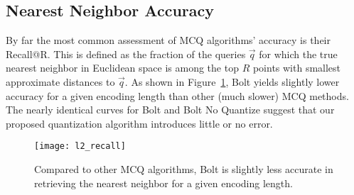 \subsection{Nearest Neighbor Accuracy}

By far the most common assessment of MCQ algorithms' accuracy is their Recall@R. This is defined as the fraction of the queries $\vec{q}$ for which the true nearest neighbor in Euclidean space is among the top $R$ points with smallest approximate distances to $\vec{q}$. As shown in Figure~\ref{fig:nn_acc}, Bolt yields slightly lower accuracy for a given encoding length than other (much slower) MCQ methods. The nearly identical curves for Bolt and Bolt No Quantize suggest that our proposed quantization algorithm introduces little or no error.

\begin{figure}[h]
\begin{center}
\label{fig:nn_acc}
\texttt{[image: l2\_recall]}
\caption{Compared to other MCQ algorithms, Bolt is slightly less accurate in retrieving the nearest neighbor for a given encoding length.}
\end{center}
\end{figure}






